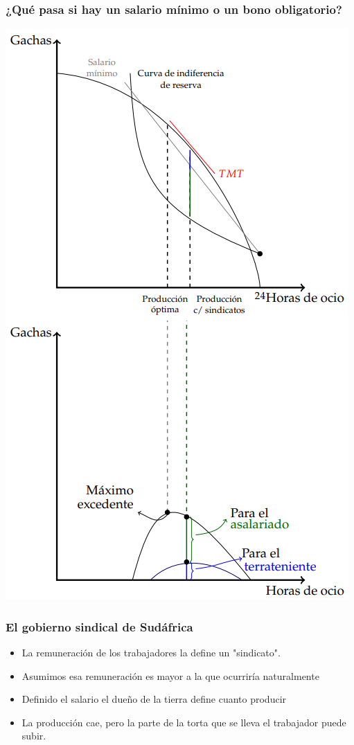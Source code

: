 \documentclass{beamer}
\begin{document}
\begin{frame}
\frametitle{¿Qué pasa si hay un salario mínimo o un bono obligatorio?}
\centering
\includegraphics[scale=0.45]{../Figures/C19.19.png}
\end{frame}

\begin{frame}
\frametitle{El gobierno sindical de Sudáfrica}
\begin{itemize}
    \item La remuneración de los trabajadores la define un "sindicato". 
    \item Asumimos esa remuneración es mayor a la que ocurriría naturalmente
    \item Definido el salario el dueño de la tierra define cuanto producir
    \item La producción cae, pero la parte de la torta que se lleva el trabajador puede subir. 
\end{itemize}
\end{frame}
\end{document}
